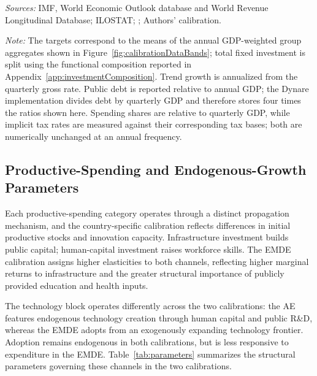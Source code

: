 \documentclass[a4paper,11pt]{article}
\newcommand{\tabnote}[2]{\vspace{2mm}\par\noindent\begin{minipage}{0.9\textwidth}\footnotesize\setlength{\parindent}{0pt}\emph{Sources: }#1\par\vspace{2mm}\emph{Note: }#2\end{minipage}}
\begin{document}
\begin{table}[H]
    \centering
    \caption{Economy-Specific Steady-State Targets \label{tab:calibrationTargets}}
    \footnotesize
    \renewcommand{\arraystretch}{1.2}
    

    \vspace{1mm}
    \tabnote{IMF, World Economic Outlook database and World Revenue Longitudinal Database; ILOSTAT; \citet{OECD2025Glance}; Authors' calibration.}{The targets correspond to the means of the annual GDP-weighted group aggregates shown in Figure~\ref{fig:calibrationDataBands}; total fixed investment is split using the functional composition reported in Appendix~\ref{app:investmentComposition}.
Trend growth is annualized from the quarterly gross rate.
Public debt is reported relative to annual GDP; the Dynare implementation divides debt by quarterly GDP and therefore stores four times the ratios shown here.
Spending shares are relative to quarterly GDP, while implicit tax rates are measured against their corresponding tax bases; both are numerically unchanged at an annual frequency.}
\end{table}

\subsection{Productive-Spending and Endogenous-Growth Parameters} \label{subsec:productive-calibration}

Each productive-spending category operates through a distinct propagation mechanism, and the country-specific calibration reflects differences in initial productive stocks and innovation capacity.
Infrastructure investment builds public capital; human-capital investment raises workforce skills.
The EMDE calibration assigns higher elasticities to both channels, reflecting higher marginal returns to infrastructure and the greater structural importance of publicly provided education and health inputs.

The technology block operates differently across the two calibrations: the AE features endogenous technology creation through human capital and public R\&D, whereas the EMDE adopts from an exogenously expanding technology frontier.
Adoption remains endogenous in both calibrations, but is less responsive to expenditure in the EMDE.
Table~\ref{tab:parameters} summarizes the structural parameters governing these channels in the two calibrations.
\end{document}
